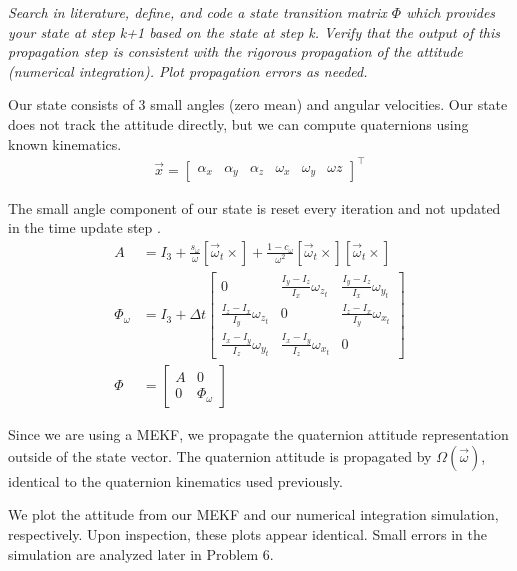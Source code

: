 

\textit{Search in literature, define, and code a state transition matrix $\Phi$ which provides your state at step k+1 based on the state at step k. Verify that the output of this propagation step is consistent with the rigorous propagation of the attitude (numerical integration). Plot propagation errors as needed.}

Our state consists of 3 small angles (zero mean) and angular velocities. Our state does not track the attitude directly, but we can compute quaternions using known kinematics.
\begin{align*}
    \Vec{x} = \begin{bmatrix}
        \alpha_{x} & \alpha_{y} & \alpha_{z} & \omega_{x} & \omega_{y} & \omega{z}
    \end{bmatrix}^{\intercal}
\end{align*}

The small angle component of our state is reset every iteration and not updated in the time update step \cite{CubeSatTelescope}.
\begin{align*}
    A &= I_{3} + \frac{s_{\omega}}{\omega} [\Vec{\omega}_{t} \times] + \frac{1 - c_{\omega}}{\omega^{2}} [\Vec{\omega}_{t} \times] [\Vec{\omega}_{t} \times] \\
    \Phi_{\omega} & = I_{3} + \Delta t \begin{bmatrix}
        0 & \frac{I_{y} - I_{z}}{I_x} \omega_{z_{t}} & \frac{I_{y} - I_{z}}{I_x} \omega_{y_{t}} \\
        \frac{I_{z} - I_{x}}{I_y} \omega_{z_{t}} & 0 & \frac{I_{z} - I_{x}}{I_y} \omega_{x_{t}} \\
        \frac{I_{x} - I_{y}}{I_z} \omega_{y_{t}} & \frac{I_{x} - I_{y}}{I_z} \omega_{x_{t}} & 0
    \end{bmatrix} \\
    \Phi &= \begin{bmatrix}
        A & 0 \\
        0 & \Phi_{\omega}
    \end{bmatrix}
\end{align*}

Since we are using a MEKF, we propagate the quaternion attitude representation outside of the state vector. The quaternion attitude is propagated by $\Omega (\Vec{\omega})$, identical to the quaternion kinematics used previously.

We plot the attitude from our MEKF and our numerical integration simulation, respectively. Upon inspection, these plots appear identical. Small errors in the simulation are analyzed later in Problem 6.

